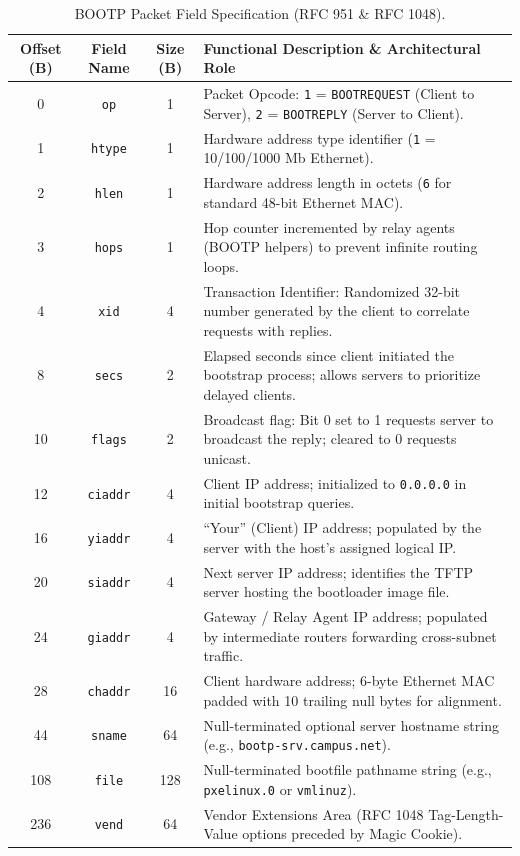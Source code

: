 \documentclass[12pt, a4paper]{article}
\begin{document}
\begin{table}[H]
\centering
\small
\begin{tabularx}{\linewidth}{|c|c|c|X|}
\hline
\textbf{Offset (B)} & \textbf{Field Name} & \textbf{Size (B)} & \textbf{Functional Description \& Architectural Role} \\ \hline
0 & \texttt{op} & 1 & Packet Opcode: \texttt{1} = \texttt{BOOTREQUEST} (Client to Server), \texttt{2} = \texttt{BOOTREPLY} (Server to Client). \\ \hline
1 & \texttt{htype} & 1 & Hardware address type identifier (\texttt{1} = 10/100/1000 Mb Ethernet). \\ \hline
2 & \texttt{hlen} & 1 & Hardware address length in octets (\texttt{6} for standard 48-bit Ethernet MAC). \\ \hline
3 & \texttt{hops} & 1 & Hop counter incremented by relay agents (BOOTP helpers) to prevent infinite routing loops. \\ \hline
4 & \texttt{xid} & 4 & Transaction Identifier: Randomized 32-bit number generated by the client to correlate requests with replies. \\ \hline
8 & \texttt{secs} & 2 & Elapsed seconds since client initiated the bootstrap process; allows servers to prioritize delayed clients. \\ \hline
10 & \texttt{flags} & 2 & Broadcast flag: Bit 0 set to 1 requests server to broadcast the reply; cleared to 0 requests unicast. \\ \hline
12 & \texttt{ciaddr} & 4 & Client IP address; initialized to \texttt{0.0.0.0} in initial bootstrap queries. \\ \hline
16 & \texttt{yiaddr} & 4 & ``Your'' (Client) IP address; populated by the server with the host's assigned logical IP. \\ \hline
20 & \texttt{siaddr} & 4 & Next server IP address; identifies the TFTP server hosting the bootloader image file. \\ \hline
24 & \texttt{giaddr} & 4 & Gateway / Relay Agent IP address; populated by intermediate routers forwarding cross-subnet traffic. \\ \hline
28 & \texttt{chaddr} & 16 & Client hardware address; 6-byte Ethernet MAC padded with 10 trailing null bytes for alignment. \\ \hline
44 & \texttt{sname} & 64 & Null-terminated optional server hostname string (e.g., \texttt{bootp-srv.campus.net}). \\ \hline
108 & \texttt{file} & 128 & Null-terminated bootfile pathname string (e.g., \texttt{pxelinux.0} or \texttt{vmlinuz}). \\ \hline
236 & \texttt{vend} & 64 & Vendor Extensions Area (RFC 1048 Tag-Length-Value options preceded by Magic Cookie). \\ \hline
\end{tabularx}
\caption{BOOTP Packet Field Specification (RFC 951 \& RFC 1048).}
\label{tab:bootp_layout}
\end{table}
\end{document}
